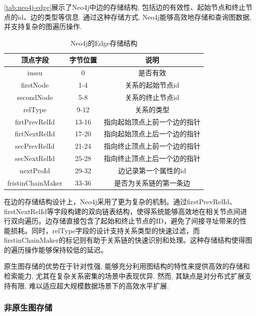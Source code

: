 \documentclass[12pt,hyperref,a4paper,UTF8]{ctexart}
\begin{document}
\autoref{tab:neo4j-edge}展示了Neo4j中边的存储结构, 包括边的有效性、起始节点和终止节点的id、边的类型等信息. 通过这种存储方式, Neo4j能够高效地存储和查询图数据, 并支持复杂的图遍历操作.
\begin{table}[H]
	\centering
	\caption{Neo4j的Edge存储结构}
	\begin{tabular}{|c|c|c|}
		\hline
		顶点字段              & 字节位置  & 说明             \\
		\hline
		iussu             & 0     & 是否有效           \\
		firstNode         & 1-4   & 关系的起始节点id      \\
		secondNode        & 5-8   & 关系的终止节点id      \\
		relType           & 9-12  & 关系的类型          \\
		firtPrevRelId     & 13-16 & 指向起始顶点上前一个边的指针 \\
		firtNextRelId     & 17-20 & 指向起始顶点上后一个边的指针 \\
		secPrevRelId      & 21-24 & 指向终止顶点上前一个边的指针 \\
		secNextRelId      & 25-28 & 指向终止顶点上后一个边的指针 \\
		nextProId         & 29-32 & 边记录第一个属性的id    \\
		fristinChainMaker & 33-36 & 是否为关系链的第一条边    \\
		\hline
	\end{tabular}
	\label{tab:neo4j-edge}
\end{table}
在边的存储结构设计上，Neo4j采用了更为复杂的机制。通过firstPrevRelId、firstNextRelId等字段构建的双向链表结构，使得系统能够高效地在相关节点间进行双向遍历。边存储直接包含了起始和终止节点的ID，避免了间接寻址带来的性能损耗。同时，relType字段的设计支持关系类型的快速过滤，而firstinChainMaker的标记则有助于关系链的快速识别和处理。这种存储结构使得图的遍历操作能够保持较低的延迟。

原生图存储的优势在于针对性强, 能够充分利用图结构的特性来提供高效的存储和检索能力, 尤其在复杂关系密集的场景中表现优异. 然而, 其缺点是对分布式扩展支持有限, 难以适应超大规模数据场景下的高效水平扩展.



\subsubsection*{非原生图存储}
\end{document}
